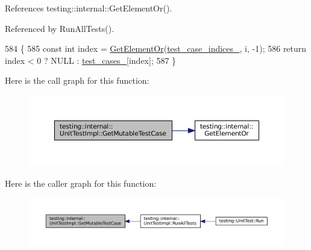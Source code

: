 References testing\+::internal\+::\+Get\+Element\+Or().



Referenced by Run\+All\+Tests().


\begin{DoxyCode}
584                                       \{
585     \textcolor{keyword}{const} \textcolor{keywordtype}{int} index = \hyperlink{namespacetesting_1_1internal_a71fdd20a0686bea3dc0cdcd95e0bca1c}{GetElementOr}(\hyperlink{classtesting_1_1internal_1_1UnitTestImpl_a9b30891f1a9d5b5c25de2bef0f0bb49a}{test\_case\_indices\_}, i, -1);
586     \textcolor{keywordflow}{return} index < 0 ? NULL : \hyperlink{classtesting_1_1internal_1_1UnitTestImpl_a79ec0f733ada2898efd1a7fbd8587fb3}{test\_cases\_}[index];
587   \}
\end{DoxyCode}
Here is the call graph for this function\+:
\nopagebreak
\begin{figure}[H]
\begin{center}
\leavevmode
\includegraphics[width=350pt]{classtesting_1_1internal_1_1UnitTestImpl_a2ca71a08060037357fc7e1a406b89add_cgraph}
\end{center}
\end{figure}
Here is the caller graph for this function\+:
\nopagebreak
\begin{figure}[H]
\begin{center}
\leavevmode
\includegraphics[width=350pt]{classtesting_1_1internal_1_1UnitTestImpl_a2ca71a08060037357fc7e1a406b89add_icgraph}
\end{center}
\end{figure}
\mbox{\label{classtesting_1_1internal_1_1UnitTestImpl_a6438e18ea4904d239a3db7b036a52229}} 

